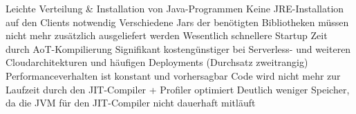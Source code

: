 Leichte Verteilung \& Installation von Java-Programmen
Keine JRE-Installation auf den Clients notwendig
Verschiedene Jars der benötigten Bibliotheken müssen nicht mehr zusätzlich ausgeliefert werden
Wesentlich schnellere Startup Zeit durch AoT-Kompilierung
Signifikant kostengünstiger bei Serverless- und weiteren Cloudarchitekturen und häufigen Deployments (Durchsatz zweitrangig)
Performanceverhalten ist konstant und vorhersagbar
Code wird nicht mehr zur Laufzeit durch den JIT-Compiler + Profiler optimiert
Deutlich weniger Speicher, da die JVM für den JIT-Compiler nicht dauerhaft mitläuft

